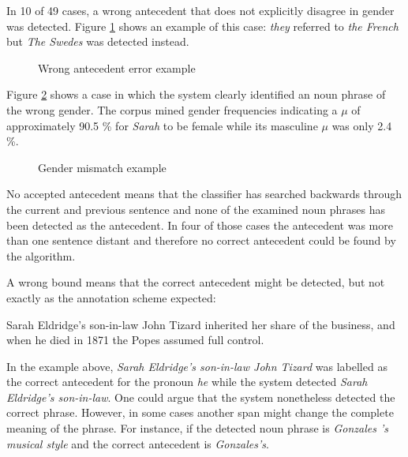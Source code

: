 In 10 of 49 cases, a wrong antecedent that does not explicitly disagree in gender was detected. Figure \ref{figure:wrongAnteError} shows an example of this case: \textit{they} referred to \textit{the French} but \textit{The Swedes} was detected instead. 

\begin{figure}[h]
\centering
\caption{Wrong antecedent error example}
	\label{figure:wrongAnteError}
\end{figure}

Figure \ref{figure:wrongGenderError} shows a case in which the system clearly identified an noun phrase of the wrong gender. The corpus mined gender frequencies indicating a $\mu$ of approximately 90.5 \% for \textit{Sarah} to be female while its masculine $\mu$ was only 2.4 \%.

\begin{figure}[h]
\centering
\caption{Gender mismatch example}
	\label{figure:wrongGenderError}
\end{figure}

No accepted antecedent means that the classifier has searched backwards through the current and previous sentence and none of the examined noun phrases has been detected as the antecedent. In four of those cases the antecedent was more than one sentence distant and therefore no correct antecedent could be found by the algorithm. 

A wrong bound means that the correct antecedent might be detected, but not exactly as the annotation scheme expected:
\begin{addmargin}[25pt]{25pt}
Sarah Eldridge's son-in-law John Tizard inherited her share of the business, and when he died in 1871 the Popes assumed full control.
\end{addmargin}
In the example above, \textit{Sarah Eldridge's son-in-law John Tizard} was labelled as the correct antecedent for the pronoun \textit{he} while the system detected \textit{Sarah Eldridge's son-in-law}. One could argue that the system nonetheless detected the correct phrase. However, in some cases another span might change the complete meaning of the phrase. For instance, if the detected noun phrase is \textit{Gonzales 's musical style} and the correct antecedent is \textit{Gonzales's}.

